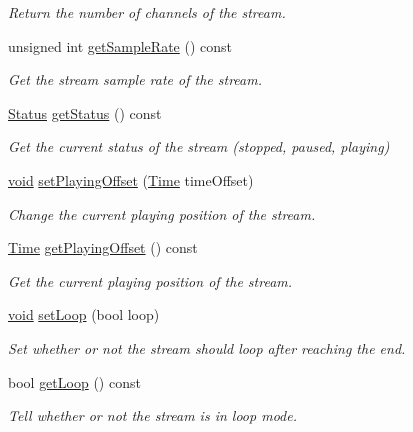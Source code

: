 \begin{DoxyCompactItemize}
\begin{DoxyCompactList}\small\item\em Return the number of channels of the stream. \end{DoxyCompactList}\item 
unsigned int \hyperlink{classsf_1_1_sound_stream_aad1da51c7a752682ca208bf11e3349bb}{get\-Sample\-Rate} () const 
\begin{DoxyCompactList}\small\item\em Get the stream sample rate of the stream. \end{DoxyCompactList}\item 
\hyperlink{classsf_1_1_sound_source_ac43af72c98c077500b239bc75b812f03}{Status} \hyperlink{classsf_1_1_sound_stream_a75f722e7edcfa9952ff0c643966c6858}{get\-Status} () const 
\begin{DoxyCompactList}\small\item\em Get the current status of the stream (stopped, paused, playing) \end{DoxyCompactList}\item 
\hyperlink{glutf90_8h_ac778d6f63f1aaf8ebda0ce6ac821b56e}{void} \hyperlink{classsf_1_1_sound_stream_af416a5f84c8750d2acb9821d78bc8646}{set\-Playing\-Offset} (\hyperlink{classsf_1_1_time}{Time} time\-Offset)
\begin{DoxyCompactList}\small\item\em Change the current playing position of the stream. \end{DoxyCompactList}\item 
\hyperlink{classsf_1_1_time}{Time} \hyperlink{classsf_1_1_sound_stream_a6070416e1e1a11b5915e9314dd6638f7}{get\-Playing\-Offset} () const 
\begin{DoxyCompactList}\small\item\em Get the current playing position of the stream. \end{DoxyCompactList}\item 
\hyperlink{glutf90_8h_ac778d6f63f1aaf8ebda0ce6ac821b56e}{void} \hyperlink{classsf_1_1_sound_stream_a43fade018ffba7e4f847a9f00b353f3d}{set\-Loop} (bool loop)
\begin{DoxyCompactList}\small\item\em Set whether or not the stream should loop after reaching the end. \end{DoxyCompactList}\item 
bool \hyperlink{classsf_1_1_sound_stream_ad8bbf6c0d2ff2d75e19035dea3fd77c3}{get\-Loop} () const 
\begin{DoxyCompactList}\small\item\em Tell whether or not the stream is in loop mode. \end{DoxyCompactList}\end{DoxyCompactItemize}
